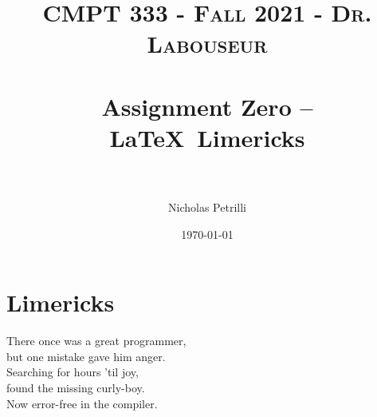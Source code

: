 \documentclass{article}
\title{	
   \normalfont \normalsize 
   \textsc{CMPT 333 - Fall 2021 - Dr. Labouseur} \\[10pt] %
   \horrule{0.5pt} \\[0.25cm] 	%
   \huge Assignment Zero -- \LaTeX ~Limericks \\     	    %
   \horrule{0.5pt} \\[0.25cm] 	%
}
\author{Nicholas Petrilli }
\date{\normalsize\today}
\begin{document}
\maketitle

\section{Limericks}
\noindent
There once was a great programmer, \\
but one mistake gave him anger. \\
   \hspace*{1.5em}Searching for hours 'til joy, \\
   \hspace*{1.5em}found the missing curly-boy.      \\
Now error-free in the compiler. \\
\end{document}
